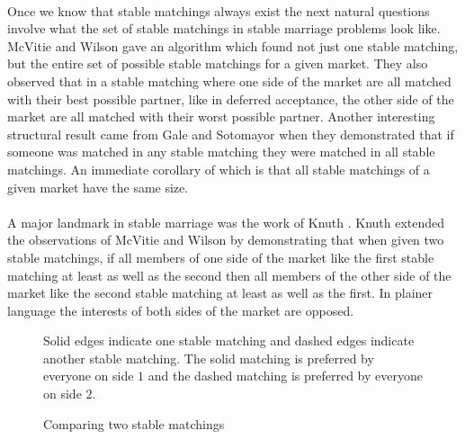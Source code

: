 \paragraph{}
Once we know that stable matchings always exist the next natural questions involve what the set of stable matchings in stable marriage problems look like. McVitie and Wilson \cite{mcvitie1971stable} gave an algorithm which found not just one stable matching, but the entire set of possible stable matchings for a given market. They also observed that in a stable matching where one side of the market are all matched with their best possible partner, like in deferred acceptance, the other side of the market are all matched with their worst possible partner. Another interesting structural result came from Gale and Sotomayor \cite{gale1985some} when they demonstrated that if someone was matched in any stable matching they were matched in all stable matchings. An immediate corollary of which is that all stable matchings of a given market have the same size. 
\paragraph{}
A major landmark in stable marriage was the work of Knuth \cite{knuthmariages}. Knuth extended the observations of McVitie and Wilson by demonstrating that when given two stable matchings, if all members of one side of the market like the first stable matching at least as well as the second then all members of the other side of the market like the second stable matching at least as well as the first. In plainer language the interests of both sides of the market are opposed.

\begin{figure}[h]
\centering
{}
\caption{Comparing two stable matchings}
\small
\begin{flushleft}
Solid edges indicate one stable matching and dashed edges indicate another stable matching. The solid matching is preferred by everyone on side $1$ and the dashed matching is preferred by everyone on side $2$.
\end{flushleft}
\end{figure}

